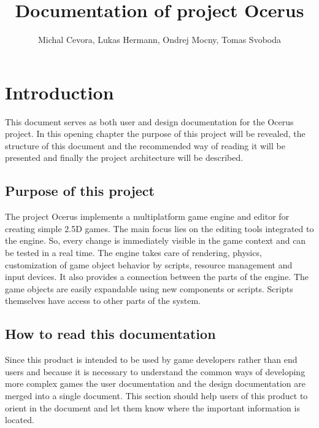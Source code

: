 \documentclass[a4paper, 12pt]{report}
\begin{document}
\pagestyle{empty} %

\title{Documentation of project Ocerus}
\author{Michal Cevora, Lukas Hermann, Ondrej Mocny, Tomas Svoboda}
\maketitle

\pagestyle{plain} %

\tableofcontents %
\cleardoublepage %

\chapter{Introduction}

This document serves as both user and design documentation for the Ocerus project. In this opening chapter the purpose of this project will be revealed, the structure of this document and the recommended way of reading it will be presented and finally the project architecture will be described.

\section{Purpose of this project}

The project Ocerus implements a multiplatform game engine and editor for creating simple 2.5D games. The main focus lies on the editing tools integrated to the engine. So, every change is immediately visible in the game context and can be tested in a real time. The engine takes care of rendering, physics, customization of game object behavior by scripts, resource management and input devices. It also provides a connection between the parts of the engine. The game objects are easily expandable using new components or scripts. Scripts themselves have access to other parts of the system.

\section{How to read this documentation}

Since this product is intended to be used by game developers rather than end users and because it is necessary to understand the common ways of developing more complex games the user documentation and the design documentation are merged into a single document. This section should help users of this product to orient in the document and let them know where the important information is located.
\end{document}
